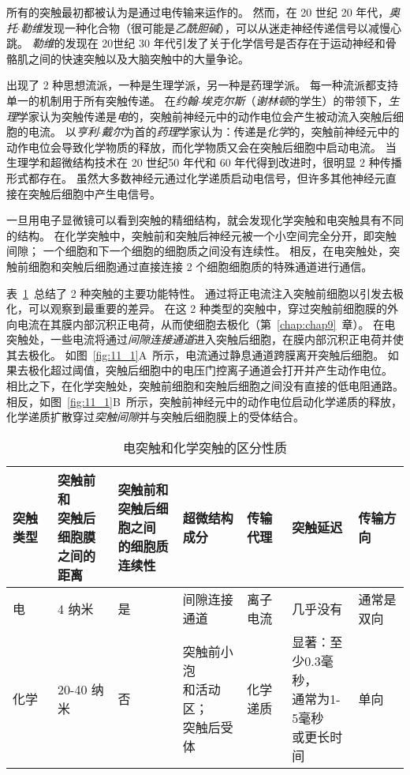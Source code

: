 所有的突触最初都被认为是通过电传输来运作的。
然而，在 20 世纪 20 年代，\textit{奥托$\cdot$勒维}发现一种化合物（很可能是\textit{乙酰胆碱}），可以从迷走神经传递信号以减慢心跳。
\textit{勒维}的发现在 20世纪 30 年代引发了关于化学信号是否存在于运动神经和骨骼肌之间的快速突触以及大脑突触中的大量争论。


出现了 2 种思想流派，一种是生理学派，另一种是药理学派。
每一种流派都支持单一的机制用于所有突触传递。
在\textit{约翰$\cdot$埃克尔斯}（\textit{谢林顿}的学生）的带领下，\textit{生理}学家认为突触传递是\textit{电}的，突触前神经元中的动作电位会产生被动流入突触后细胞的电流。
以\textit{亨利$\cdot$戴尔}为首的\textit{药理}学家认为：传递是\textit{化学}的，突触前神经元中的动作电位会导致化学物质的释放，而化学物质又会在突触后细胞中启动电流。
当生理学和超微结构技术在 20 世纪50 年代和 60 年代得到改进时，很明显 2 种传播形式都存在。
虽然大多数神经元通过化学递质启动电信号，但许多其他神经元直接在突触后细胞中产生电信号。


一旦用电子显微镜可以看到突触的精细结构，就会发现化学突触和电突触具有不同的结构。
在化学突触中，突触前和突触后神经元被一个小空间完全分开，即突触间隙；
一个细胞和下一个细胞的细胞质之间没有连续性。
相反，在电突触处，突触前细胞和突触后细胞通过直接连接 2 个细胞细胞质的特殊通道进行通信。


表~\ref{tab:11_1}~总结了 2 种突触的主要功能特性。
通过将正电流注入突触前细胞以引发去极化，可以观察到最重要的差异。
在这 2 种类型的突触中，穿过突触前细胞膜的外向电流在其膜内部沉积正电荷，从而使细胞去极化（第~\ref{chap:chap9}~章）。
在电突触处，一些电流将通过\textit{间隙连接通道}进入突触后细胞，在膜内部沉积正电荷并使其去极化。
如图~\ref{fig:11_1}A~所示，电流通过静息通道跨膜离开突触后细胞。
如果去极化超过阈值，突触后细胞中的电压门控离子通道会打开并产生动作电位。
相比之下，在化学突触处，突触前细胞和突触后细胞之间没有直接的低电阻通路。
相反，如图~\ref{fig:11_1}B~所示，突触前神经元中的动作电位启动化学递质的释放，化学递质扩散穿过\textit{突触间隙}并与突触后细胞膜上的受体结合。


\begin{table}[htbp]
	\caption{电突触和化学突触的区分性质} \label{tab:11_1} \centering
	\begin{tabular}{lllllll}
		\toprule
		突触类型 & \makecell{突触前和\\突触后细胞膜\\之间的距离} & \makecell{突触前和\\突触后细胞之间\\的细胞质连续性} & 超微结构成分 & 传输代理 & 突触延迟 & 传输方向 \\
		\midrule
		电 & 4 纳米 & 是 & 间隙连接通道 & 离子电流 & 几乎没有 & 通常是双向 \\
		化学 & 20-40 纳米 & 否 & \makecell[l]{突触前小泡\\和活动区；\\突触后受体} & 化学递质 & \makecell[l]{显著：至\\少0.3毫秒，\\通常为1-5毫秒\\或更长时间} & 单向 \\
		\bottomrule
	\end{tabular}
\end{table}


